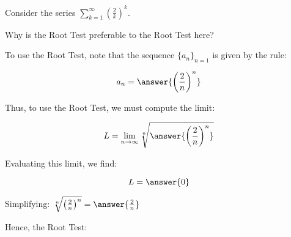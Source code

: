 \documentclass{ximera}
\author{Jim Talamo}
\begin{document}
\begin{exercise}
Consider the series $\sum_{k=1}^{\infty} \left(\frac{2}{k}\right)^k$.

\begin{multipleChoice}
\end{multipleChoice}

Why is the Root Test preferable to the Root Test here?
\begin{multipleChoice}
\end{multipleChoice}

To use the Root Test, note that the sequence $\{a_n\}_{n=1}$ is given by the rule:

\[
a_n = \answer{\left(\frac{2}{n}\right)^n}
\]

Thus, to use the Root Test, we must compute the limit:

\[
L = \lim_{n \to \infty} \sqrt[n]{\answer{\left(\frac{2}{n}\right)^n}} 
\]

Evaluating this limit, we find:

\[
L = \answer{0}
\]

\begin{hint}
Simplifying: $ \sqrt[n]{\left(\frac{2}{n}\right)^n} = \answer{ \frac{2}{n}}$
\end{hint}

Hence, the Root Test:
\begin{multipleChoice}
\end{multipleChoice}

\end{exercise}
\end{document}
